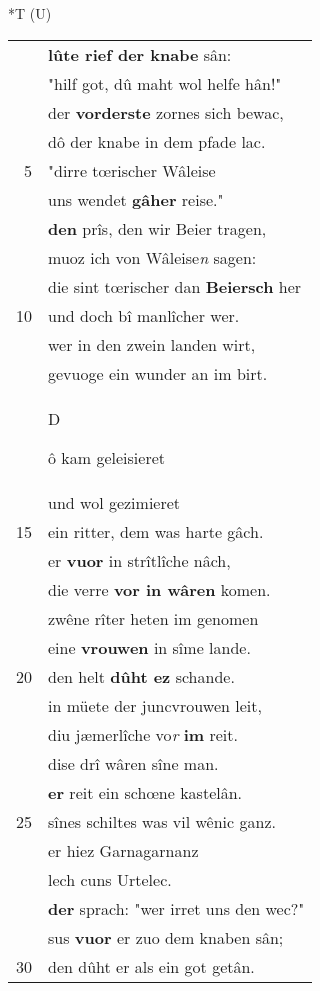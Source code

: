 \documentclass[8pt,a4paper,notitlepage]{article}
\begin{document}
\begin{table}[ht]
\begin{minipage}[t]{0.5\linewidth}
\small
\begin{center}*T (U)
\end{center}
\begin{tabular}{rl}
 & \textbf{lûte rief der knabe} sân:\\ 
 & "hilf got, dû maht wol helfe hân!"\\ 
 & der \textbf{vorderste} zornes sich bewac,\\ 
 & dô der knabe in dem pfade lac.\\ 
5 & "dirre tœrischer Wâleise\\ 
 & uns wendet \textbf{gâher} reise."\\ 
 & \textbf{den} prîs, den wir Beier tragen,\\ 
 & muoz ich von Wâleise\textit{n} sagen:\\ 
 & die sint tœrischer dan \textbf{Beiersch} her\\ 
10 & und doch bî manlîcher wer.\\ 
 & wer in den zwein landen wirt,\\ 
 & gevuoge ein wunder an im birt.\\ 
 & \begin{large}D\end{large}ô kam geleisieret\\ 
 & und wol gezimieret\\ 
15 & ein ritter, dem was harte gâch.\\ 
 & er \textbf{vuor} in strîtlîche nâch,\\ 
 & die verre \textbf{vor in wâren} komen.\\ 
 & zwêne rîter heten im genomen\\ 
 & eine \textbf{vrouwen} in sîme lande.\\ 
20 & den helt \textbf{dûht ez} schande.\\ 
 & in müete der juncvrouwen leit,\\ 
 & diu jæmerlîche vo\textit{r} \textbf{im} reit.\\ 
 & dise drî wâren sîne man.\\ 
 & \textbf{er} reit ein schœne kastelân.\\ 
25 & sînes schiltes was vil wênic ganz.\\ 
 & er hiez Garnagarnanz\\ 
 & lech cuns Urtelec.\\ 
 & \textbf{der} sprach: "wer irret uns den wec?"\\ 
 & sus \textbf{vuor} er zuo dem knaben sân;\\ 
30 & den dûht er als ein got getân.\\ 

\end{tabular}
\end{minipage}
\end{table}
\end{document}
